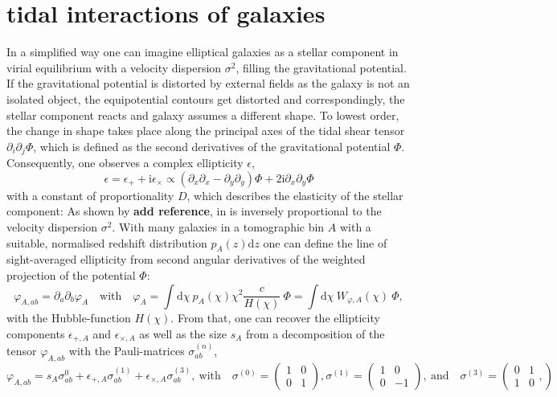 \documentclass[a4paper,fleqn,usenatbib]{mnras}
\def\spirou#1{{\bf #1}}
\newcommand{\dd}{\mathrm{d}}
\newcommand{\ci}{\mathrm{i}}
\begin{document}
\section{tidal interactions of galaxies}\label{sect_tidal}
In a simplified way one can imagine elliptical galaxies as a stellar component in virial equilibrium with a velocity dispersion $\sigma^2$, filling the gravitational potential. If the gravitational potential is distorted by external fields as the galaxy is not an isolated object, the equipotential contours get distorted and correspondingly, the stellar component reacts and galaxy assumes a different shape. To lowest order, the change in shape takes place along the principal axes of the tidal shear tensor $\partial_i\partial_j\Phi$, which is defined as the second derivatives of the gravitational potential $\Phi$. Consequently, one observes a complex ellipticity $\epsilon$,
\begin{equation}
\epsilon = \epsilon_+ + \ci\epsilon_\times \propto 
(\partial_x\partial_x-\partial_y\partial_y)\Phi +2\ci\partial_x\partial_y\Phi
\end{equation}
with a constant of proportionality $D$, which describes the elasticity of the stellar component: As shown by \spirou{add reference}, in is inversely proportional to the velocity dispersion $\sigma^2$. With many galaxies in a tomographic bin $A$ with a suitable, normalised redshift distribution $p_A(z)\dd z$ one can define the line of sight-averaged ellipticity from second angular derivatives of the weighted projection of the potential $\Phi$:
\begin{equation}
\varphi_{A,ab} = \partial_a\partial_b\varphi_A
\quad\mathrm{with}\quad
\varphi_A = \int\dd\chi\:p_A(\chi)\chi^2\frac{c}{H(\chi)}\:\Phi = \int\dd\chi\:W_{\varphi,A}(\chi)\:\Phi,
\end{equation}
with the Hubble-function $H(\chi)$. From that, one can recover the ellipticity components $\epsilon_{+,A}$ and $\epsilon_{\times,A}$ as well as the size $s_A$ from a decomposition of the tensor $\varphi_{A,ab}$ with the Pauli-matrices $\sigma_{ab}^{(n)}$,
\begin{equation}
\varphi_{A,ab} = s_A\sigma^{0}_{ab} + \epsilon_{+,A}\sigma^{(1)}_{ab} + \epsilon_{\times,A}\sigma^{(3)}_{ab},
\mathrm{~with}\quad
\sigma^{(0)} = \left(
\begin{array}{cc}
1 & 0 \\ 0 & 1
\end{array}
\right),
\sigma^{(1)} = \left(
\begin{array}{cc}
1 & 0 \\ 0 & -1
\end{array}
\right),
\mathrm{~and}\quad
\sigma^{(3)} = \left(
\begin{array}{cc}
0 & 1 \\ 1 & 0
\end{array},
\right)
\end{equation}
\end{document}
